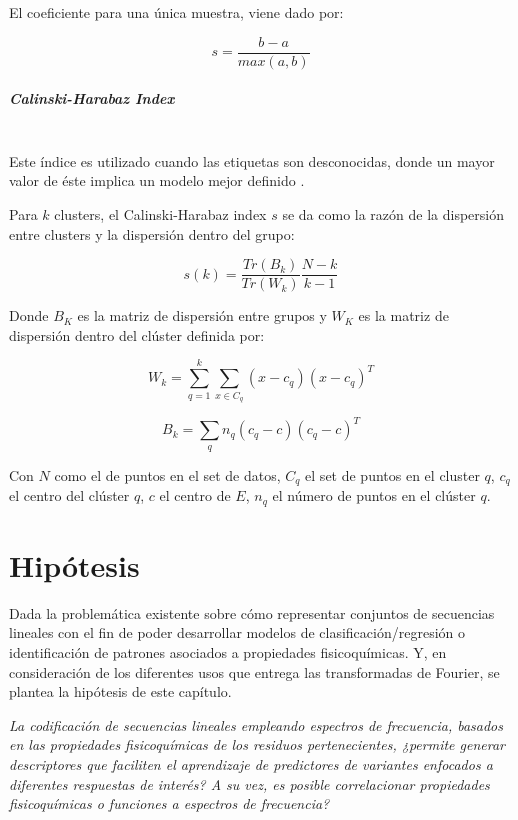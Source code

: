 El coeficiente para una única muestra, viene dado por:

\begin{equation}	
	s = \frac{b - a}{max(a, b)}
\end{equation}

\subparagraph{Calinski-Harabaz Index\\\\}

Este índice es utilizado cuando las etiquetas son desconocidas, donde un mayor valor de éste implica un modelo mejor definido \cite{calinski1974dendrite}.

Para $k$ clusters, el Calinski-Harabaz index $s$ se da como la razón de la dispersión entre clusters y la dispersión dentro del grupo:

\begin{equation}
	s(k) = \frac{Tr(B_k)}{Tr(W_k)}  \frac{N - k}{k - 1}
\end{equation}


Donde $B_{K}$ es la matriz de dispersión entre grupos y $W_{K}$ es la matriz de dispersión dentro del clúster definida por:

\begin{equation}	
	W_k = \sum_{q=1}^k \sum_{x \in C_q} (x - c_q) (x - c_q)^T
\end{equation}

\begin{equation}
	B_k = \sum_q n_q (c_q - c) (c_q - c)^T
\end{equation}

Con $N$ como el de puntos en el set de datos, $C_{q}$ el set de puntos en el cluster $q$, $c_{q}$ el centro del clúster $q$, $c$ el centro de $E$, $n_{q}$ el número de puntos en el clúster $q$.

\section{Hipótesis}

Dada la problemática existente sobre cómo representar conjuntos de secuencias lineales con el fin de poder desarrollar modelos de clasificación/regresión o identificación de patrones asociados a propiedades fisicoquímicas. Y, en consideración de los diferentes usos que entrega las transformadas de Fourier, se plantea la hipótesis de este capítulo.

\begin{center}
	\textit{La codificación de secuencias lineales empleando espectros de frecuencia, basados en las propiedades fisicoquímicas de los residuos pertenecientes, ¿permite generar descriptores que faciliten el aprendizaje de predictores de variantes enfocados a diferentes respuestas de interés? A su vez, es posible correlacionar propiedades fisicoquímicas o funciones a espectros de frecuencia?
}
\end{center}

